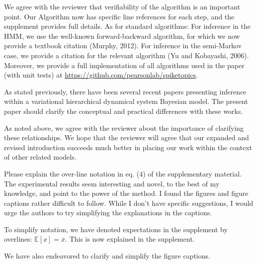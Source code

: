 \documentclass[12pt,a4paper]{article}
\newcommand{\edit}[1]{\textcolor{edit}{#1}}
\begin{document}
\edit{
We agree with the reviewer that verifiability of the algorithm is an important point. Our Algorithm now has specific line references for each step, and the supplement provides full details. As for standard algorithms:
For inference in the HMM, we use the well-known forward-backward algorithm, for which we now provide a textbook citation (Murphy, 2012). For inference in the semi-Markov case, we provide a citation for the relevant algorithm (Yu and Kobayashi, 2006). Moreover, we provide a full implementation of all algorithms used in the paper (with unit tests) at \url{https://github.com/pearsonlab/spiketopics}.
}

As stated previously, there have been several recent papers presenting inference within a variational hierarchical dynamical system Bayesian model. The present paper should clarify the conceptual and practical differences with these works.

\edit{
As noted above, we agree with the reviewer about the importance of clarifying these relationships. We hope that the reviewer will agree that our expanded and revised introduction succeeds much better in placing our work within the context of other related models.
}

Please explain the over-line notation in eq. (4) of the supplementary material.
The experimental results seem interesting and novel, to the best of my knowledge, and point to the power of the method. I found the figures and figure captions rather difficult to follow. While I don’t have specific suggestions, I would urge the authors to try simplifying the explanations in the captions.

\edit{
To simplify notation, we have denoted expectations in the supplement by overlines: $\mathbb{E}[x] = \overline{x}$. This is now explained in the supplement.
}

\edit{We have also endeavored to clarify and simplify the figure captions.}
\end{document}
